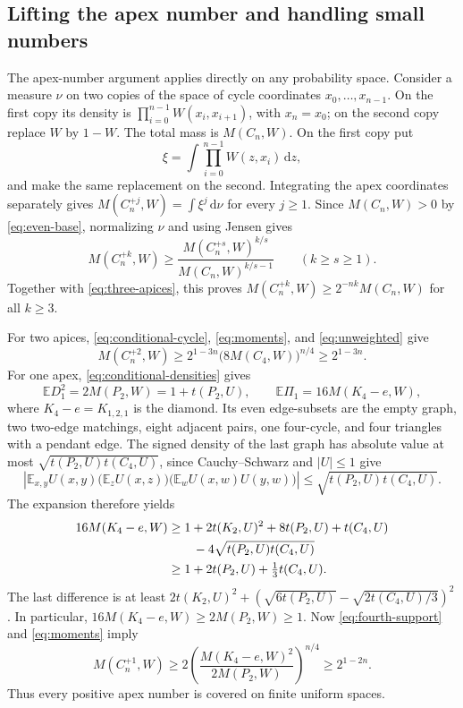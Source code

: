 \documentclass[11pt,a4paper]{article}
\theoremstyle{remark}
\numberwithin{equation}{section}
\newcommand{\E}{\mathbb E}
\newcommand{\dd}{\,\mathrm d}
\begin{document}
\subsection{Lifting the apex number and handling small numbers}

The apex-number argument applies directly on any probability
space. Consider a measure $\nu$ on two copies of the space of
cycle coordinates $x_0,\ldots,x_{n-1}$. On the first copy its
density is $\prod_{i=0}^{n-1}W(x_i,x_{i+1})$, with $x_n=x_0$;
on the second copy replace $W$ by $1-W$.
The total mass is $M(C_n,W)$. On the first copy put
\[
 \xi=\int\prod_{i=0}^{n-1}W(z,x_i)\dd z,
\]
and make the same replacement on the second.
Integrating the apex coordinates separately gives
$M(C_n^{+j},W)=\int\xi^j\dd\nu$ for every $j\geq1$.
Since $M(C_n,W)>0$ by \eqref{eq:even-base}, normalizing
$\nu$ and using Jensen gives
\begin{equation}\label{eq:apex-lifting}
 M(C_n^{+k},W)\geq
 \frac{M(C_n^{+s},W)^{k/s}}{M(C_n,W)^{k/s-1}}
 \qquad(k\geq s\geq1).
\end{equation}
Together with \eqref{eq:three-apices}, this proves
$M(C_n^{+k},W)\geq2^{-nk}M(C_n,W)$ for all $k\geq3$.

For two apices, \eqref{eq:conditional-cycle},
\eqref{eq:moments}, and \eqref{eq:unweighted} give
\begin{equation}\label{eq:two-apices}
 M(C_n^{+2},W)
 \geq2^{1-3n}\bigl(8M(C_4,W)\bigr)^{n/4}
 \geq2^{1-3n}.
\end{equation}
For one apex, \eqref{eq:conditional-densities} gives
\[
 \E D_1^2=2M(P_2,W)=1+t(P_2,U),\qquad
 \E\Pi_1=16M(K_4-e,W),
\]
where $K_4-e=K_{1,2,1}$ is the diamond.
Its even edge-subsets are the empty graph, two two-edge
matchings, eight adjacent pairs, one four-cycle, and four
triangles with a pendant edge. The signed density of the last
graph has absolute value at most
$\sqrt{t(P_2,U)t(C_4,U)}$, since Cauchy--Schwarz and $|U|\leq1$
give
\[
 \left|\E_{x,y}U(x,y)
   \bigl(\E_zU(x,z)\bigr)
   \bigl(\E_wU(x,w)U(y,w)\bigr)\right|
 \leq\sqrt{t(P_2,U)t(C_4,U)}.
\]
The expansion therefore yields
\begin{align}
 16M(K_4-e,W)
 &\geq1+2t(K_2,U)^2+8t(P_2,U)+t(C_4,U)\notag\\
 &\qquad-4\sqrt{t(P_2,U)t(C_4,U)}\label{eq:diamond}\\
 &\geq1+2t(P_2,U)+\tfrac13t(C_4,U).
 \label{eq:diamond-bound}
\end{align}
The last difference is at least
$2t(K_2,U)^2+
 (\sqrt{6t(P_2,U)}-\sqrt{2t(C_4,U)/3})^2$.
In particular, $16M(K_4-e,W)\geq2M(P_2,W)\geq1$.
Now \eqref{eq:fourth-support} and \eqref{eq:moments} imply
\begin{equation}\label{eq:one-apex}
 M(C_n^{+1},W)
 \geq2\left(\frac{M(K_4-e,W)^2}{2M(P_2,W)}\right)^{n/4}
 \geq2^{1-2n}.
\end{equation}
Thus every positive apex number is covered on finite uniform
spaces.
\end{document}

